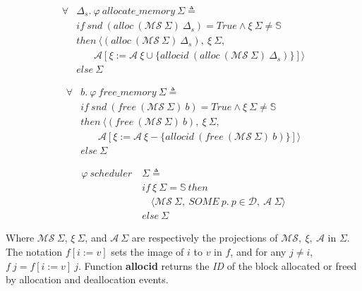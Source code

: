 \begin{definition} 
\end{definition}
\vspace{-7pt}
\begin{align*}
\forall &\Delta_s.\ \varphi\ allocate\_memory\ \Sigma \triangleq\\
&if\ snd\ (alloc\ (\mathcal{MS}\ \Sigma)\ \Delta_s) = True \wedge \xi\ \Sigma \neq \mathbb{S}\\
&then\ \langle (alloc\ (\mathcal{MS}\ \Sigma)\ \Delta_s),\ \xi\ \Sigma,\\
&\ \ \ \ \ \ \ \ \mathcal{A}[\xi := \mathcal{A}\ \xi \cup \lbrace allocid\ (alloc\ (\mathcal{MS}\ \Sigma)\ \Delta_s) \rbrace] \rangle\\
&else\ \Sigma
\end{align*}
\vspace{-12pt}

\begin{definition} 
\end{definition}
\vspace{-7pt}	
\begin{align*}
\forall &b.\ \varphi\ free\_memory\ \Sigma \triangleq\\ 
&if\ snd\ (free\ (\mathcal{MS}\ \Sigma)\ b) = True \wedge \xi\ \Sigma \neq \mathbb{S}\\
&then\ \langle (free\ (\mathcal{MS}\ \Sigma)\ b),\ \xi\ \Sigma,\\
&\ \ \ \ \ \ \ \ \mathcal{A}[\xi := \mathcal{A}\ \xi - \lbrace allocid\ (free\ (\mathcal{MS}\ \Sigma)\ b) \rbrace] \rangle\\
&else\ \Sigma
\end{align*}
\vspace{-12pt}

\begin{definition} [Scheduler]
\end{definition}
\vspace{-7pt}	
\begin{align*}
\varphi\ scheduler\ &\Sigma \triangleq\\
&if\ \xi\ \Sigma = \mathbb{S}\ then\\
&\ \ \ \ \langle \mathcal{MS}\ \Sigma,\ SOME\ p.\ p \in \mathcal{D},\ \mathcal{A}\ \Sigma \rangle\\
&else\ \Sigma
\end{align*}
\vspace{-12pt}

Where $\mathcal{MS}\ \Sigma$, $\xi\ \Sigma$, and $\mathcal{A}\ \Sigma$ are respectively the projections of $\mathcal{MS},\ \xi,\ \mathcal{A}$ in $\Sigma$. The notation $f[i:=v]$ sets the image of $i$ to $v$ in $f$, and for any $j\neq i$, $f\ j = f[i:=v]\ j$. Function \textbf{allocid} returns the \emph{ID} of the block allocated or freed by allocation and deallocation events.

